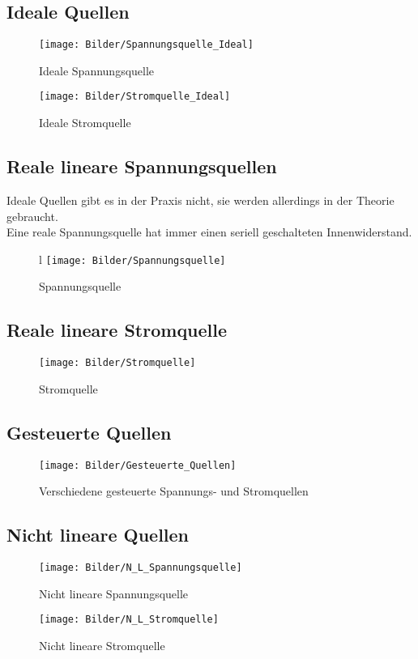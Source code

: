 \documentclass{article}
\begin{document}
	\subsection{Ideale Quellen}
		\begin{figure}[htbp]
		\centering
		\begin{minipage}[b]{0.4 \textwidth}
			\texttt{[image: Bilder/Spannungsquelle\_Ideal]}
			\caption{Ideale Spannungsquelle}
		\end{minipage}
		\hfill
		\begin{minipage}[b]{0.4 \textwidth}
			\texttt{[image: Bilder/Stromquelle\_Ideal]}
			\caption{Ideale Stromquelle}
		\end{minipage}
		\end{figure}
	\subsection{Reale lineare Spannungsquellen}
	Ideale Quellen gibt es in der Praxis nicht, sie werden allerdings in der Theorie gebraucht. \\
	Eine reale Spannungsquelle hat immer einen seriell geschalteten Innenwiderstand.
	\begin{figure}[htbp]l
		\centering
		\texttt{[image: Bilder/Spannungsquelle]}
		\caption{Spannungsquelle}
	\end{figure} 
	\subsection{Reale lineare Stromquelle}
	\begin{figure}[htbp]
		\centering
		\texttt{[image: Bilder/Stromquelle]}
		\caption{Stromquelle}
	\end{figure}
	\subsection{Gesteuerte Quellen}
		\begin{figure}[htbp]
		\centering
		\texttt{[image: Bilder/Gesteuerte\_Quellen]}
		\caption{Verschiedene gesteuerte Spannungs- und Stromquellen}
	\end{figure}
	\subsection{Nicht lineare Quellen}
\begin{figure}[htbp]
	\centering
	\begin{minipage}[b]{0.4 \textwidth}
		\texttt{[image: Bilder/N\_L\_Spannungsquelle]}
		\caption{Nicht lineare Spannungsquelle}
	\end{minipage}
	\hfill
	\begin{minipage}[b]{0.4 \textwidth}
		\texttt{[image: Bilder/N\_L\_Stromquelle]}
		\caption{Nicht lineare Stromquelle}
	\end{minipage}
\end{figure}
\newpage
\end{document}
